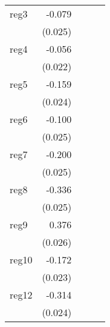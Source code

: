 {\begin{longtable}{l*{4}{D{.}{.}{-1}}}
\addlinespace
reg3        &      -0.079\sym{**} &                     &                     &                     \\
            &     (0.025)         &                     &                     &                     \\
\addlinespace
reg4        &      -0.056\sym{*}  &                     &                     &                     \\
            &     (0.022)         &                     &                     &                     \\
\addlinespace
reg5        &      -0.159\sym{***}&                     &                     &                     \\
            &     (0.024)         &                     &                     &                     \\
\addlinespace
reg6        &      -0.100\sym{***}&                     &                     &                     \\
            &     (0.025)         &                     &                     &                     \\
\addlinespace
reg7        &      -0.200\sym{***}&                     &                     &                     \\
            &     (0.025)         &                     &                     &                     \\
\addlinespace
reg8        &      -0.336\sym{***}&                     &                     &                     \\
            &     (0.025)         &                     &                     &                     \\
\addlinespace
reg9        &       0.376\sym{***}&                     &                     &                     \\
            &     (0.026)         &                     &                     &                     \\
\addlinespace
reg10       &      -0.172\sym{***}&                     &                     &                     \\
            &     (0.023)         &                     &                     &                     \\
\addlinespace
reg12       &      -0.314\sym{***}&                     &                     &                     \\
            &     (0.024)         &                     &                     &                     \\

\end{longtable}}
